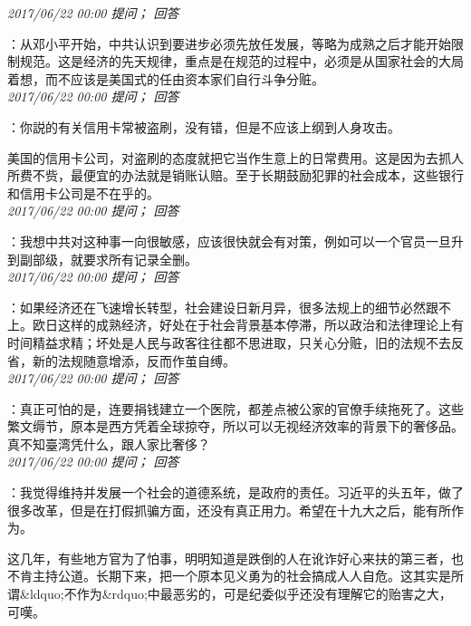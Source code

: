\documentclass[twocolumn]{ctexart}
\begin{document}
\textit{\hfill\noindent\small 2017/06/22 00:00 提问； 回答}

：从邓小平开始，中共认识到要进步必须先放任发展，等略为成熟之后才能开始限制规范。这是经济的先天规律，重点是在规范的过程中，必须是从国家社会的大局着想，而不应该是美国式的任由资本家们自行斗争分赃。\\

\textit{\hfill\noindent\small 2017/06/22 00:00 提问； 回答}

：你説的有关信用卡常被盗刷，没有错，但是不应该上纲到人身攻击。

美国的信用卡公司，对盗刷的态度就把它当作生意上的日常费用。这是因为去抓人所费不赀，最便宜的办法就是销账认赔。至于长期鼓励犯罪的社会成本，这些银行和信用卡公司是不在乎的。\\

\textit{\hfill\noindent\small 2017/06/22 00:00 提问； 回答}

：我想中共对这种事一向很敏感，应该很快就会有对策，例如可以一个官员一旦升到副部级，就要求所有记录全删。\\

\textit{\hfill\noindent\small 2017/06/22 00:00 提问； 回答}

：如果经济还在飞速增长转型，社会建设日新月异，很多法规上的细节必然跟不上。欧日这样的成熟经济，好处在于社会背景基本停滞，所以政治和法律理论上有时间精益求精；坏处是人民与政客往往都不思进取，只关心分赃，旧的法规不去反省，新的法规随意增添，反而作茧自缚。\\

\textit{\hfill\noindent\small 2017/06/22 00:00 提问； 回答}

：真正可怕的是，连要捐钱建立一个医院，都差点被公家的官僚手续拖死了。这些繁文缛节，原本是西方凭着全球掠夺，所以可以无视经济效率的背景下的奢侈品。真不知臺湾凭什么，跟人家比奢侈？\\

\textit{\hfill\noindent\small 2017/06/22 00:00 提问； 回答}

：我觉得维持并发展一个社会的道德系统，是政府的责任。习近平的头五年，做了很多改革，但是在打假抓骗方面，还没有真正用力。希望在十九大之后，能有所作为。

这几年，有些地方官为了怕事，明明知道是跌倒的人在讹诈好心来扶的第三者，也不肯主持公道。长期下来，把一个原本见义勇为的社会搞成人人自危。这其实是所谓\&ldquo;不作为\&rdquo;中最恶劣的，可是纪委似乎还没有理解它的贻害之大，可嘆。\\
\end{document}
